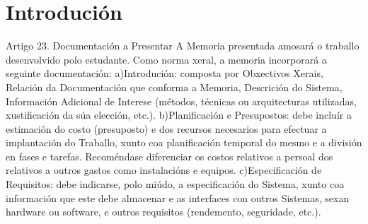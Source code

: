 \chapter{Introdución}

Artigo 23. Documentación a Presentar 
A  Memoria  presentada  amosará  o  traballo  desenvolvido  polo  estudante.  Como  norma  xeral,  a 
memoria incorporará a seguinte documentación: 
a)Introdución:  composta  por  Obxectivos  Xerais,  Relación  da  Documentación  que  conforma  a 
Memoria,  Descrición  do  Sistema,  Información  Adicional  de  Interese  (métodos,  técnicas  ou 
arquitecturas utilizadas, xustificación da súa elección, etc.). 
b)Planificación  e  Presupostos:  debe  incluír  a  estimación  do  costo  (presuposto)  e  dos  recursos 
necesarios para efectuar a implantación do Traballo, xunto coa planificación temporal do mesmo e 
a división en fases e tarefas. Recoméndase diferenciar os costos relativos a persoal dos relativos a 
outros gastos como instalacións e equipos. 
c)Especificación de Requisitos: debe indicarse, polo miúdo, a especificación do Sistema, xunto coa 
información  que  este  debe  almacenar  e  as  interfaces  con  outros  Sistemas,  sexan  hardware  ou 
software, e outros requisitos (rendemento, seguridade, etc.). 

